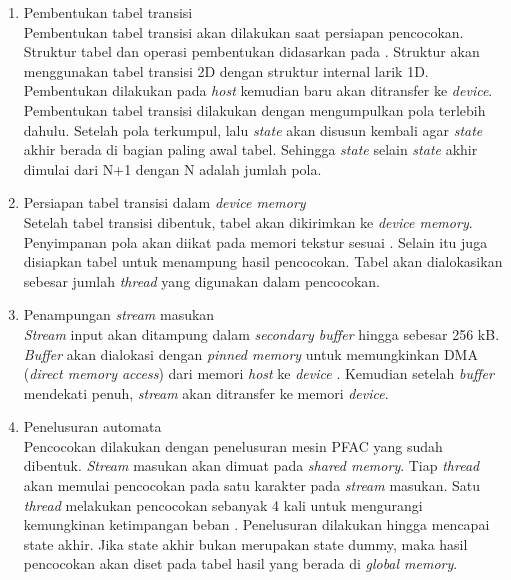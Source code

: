       \begin{enumerate}

      \item
      Pembentukan tabel transisi \\
      Pembentukan tabel transisi akan dilakukan saat persiapan pencocokan. Struktur
      tabel dan operasi pembentukan didasarkan pada \cite{lin2013}. Struktur akan
      menggunakan tabel transisi 2D dengan struktur internal larik 1D. Pembentukan dilakukan pada \emph{host} kemudian baru akan ditransfer ke \emph{device}. Pembentukan tabel transisi dilakukan dengan mengumpulkan pola terlebih dahulu. Setelah pola terkumpul, lalu \emph{state} akan disusun kembali agar \emph{state} akhir berada di bagian paling awal tabel. Sehingga \emph{state} selain \emph{state} akhir dimulai dari N+1 dengan N adalah jumlah pola. 

      \item
      Persiapan tabel transisi dalam \emph{device memory} \\
      Setelah tabel transisi dibentuk, tabel akan dikirimkan ke \emph{device memory}. Penyimpanan pola akan diikat pada memori tekstur sesuai \cite{lin2013}. Selain itu juga disiapkan tabel untuk menampung hasil pencocokan. Tabel akan dialokasikan sebesar jumlah \emph{thread} yang digunakan dalam pencocokan.

      \item
      Penampungan \emph{stream} masukan \\
      \emph{Stream} input akan ditampung dalam \emph{secondary buffer} hingga sebesar 256 kB. \emph{Buffer} akan dialokasi dengan \emph{pinned memory} untuk memungkinkan DMA (\emph{direct memory access}) dari memori \emph{host} ke \emph{device} \citep{gnort2008}. Kemudian setelah \emph{buffer} mendekati penuh, \emph{stream} akan ditransfer ke memori \emph{device}.

      \item
      Penelusuran automata \\
      Pencocokan dilakukan dengan penelusuran mesin PFAC yang sudah dibentuk. \emph{Stream} masukan akan dimuat pada \emph{shared memory}. Tiap \emph{thread} akan memulai pencocokan pada satu karakter pada \emph{stream} masukan. Satu \emph{thread} melakukan pencocokan sebanyak 4 kali untuk mengurangi kemungkinan ketimpangan beban \citep{lin2013}. Penelusuran dilakukan hingga mencapai state akhir. Jika state akhir bukan merupakan state dummy, maka hasil pencocokan akan diset pada tabel hasil yang berada di \emph{global memory}.

      \end{enumerate}

